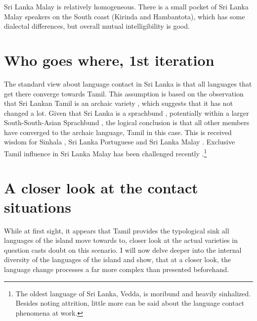 \documentclass[handout,utf8]{article}
\begin{document}
Sri Lanka Malay is relatively homogeneous. There is a small pocket of Sri Lanka Malay speakers on the South coast (Kirinda and Hambantota), which has some dialectal differences, but overall mutual intelligibility is good. 



\section{Who goes where, 1st iteration}
The standard view about language contact in Sri Lanka is that all languages that get there converge towards Tamil. This assumption is based on the observation that Sri Lankan Tamil is an archaic variety \citep{Zvelebil1959II}, which suggests that it has not changed a lot. Given that Sri Lanka is a sprachbund \citep{Bakker2012}, potentially within a larger South-South-Asian Sprachbund \citep{Gair2012}, the logical conclusion is that all other members have converged to the archaic language, Tamil in this case. This is received wisdom for Sinhala \citep{Geiger, Gair, Elizarenkova1972}, Sri Lanka Portuguese \citep{Smith, Jayasuriya} and Sri Lanka Malay \citep{Hussainmiya, Smith, Bakker}. Exclusive Tamil influence in Sri Lanka Malay has been challenged recently \citep{Ansaldo, Nordhoff}.\footnote{The oldest language of Sri Lanka, Vedda, is moribund and heavily sinhalized. Besides noting attrition, little more can be said about the language contact phenomena at work.}


\section{A closer look at the contact situations}
While at first sight, it appears that Tamil provides the typological sink all languages of the island move towards to, closer look at the actual varieties in question casts doubt on this scenario. I will now delve deeper into the internal diversity of the languages of the island and show, that at a closer look, the language change processes a far more complex than presented beforehand. 
\end{document}
